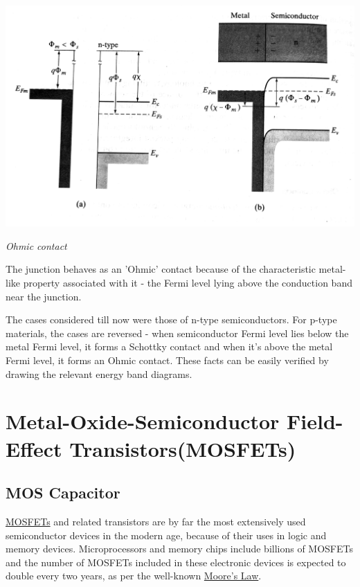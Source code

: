 \documentclass[12 pt]{article}
\begin{document}
\par
\begin{center}
    \includegraphics{Ohmic_Contact.png}
\end{center}
\begin{center}
    \emph{\hspace{2 cm}Ohmic contact\newline}
\end{center}
\par

The junction behaves as an 'Ohmic' contact because of the characteristic metal-like property associated with it - the Fermi level lying above the conduction band near the junction. \par

The cases considered till now were those of n-type semiconductors. For p-type materials, the cases are reversed - when semiconductor Fermi level lies below the metal Fermi level, it forms a Schottky contact and when it's above the metal Fermi level, it forms an Ohmic contact. These facts can be easily verified by drawing the relevant energy band diagrams. \par


\section{Metal-Oxide-Semiconductor Field-Effect Transistors(MOSFETs)}

\subsection{MOS Capacitor}

\href{https://en.wikipedia.org/wiki/MOSFET#:~:text=The%20metal%E2%80%93oxide%E2%80%93semiconductor%20field,the%20conductivity%20of%20the%20device.}{MOSFETs} and related transistors are by far the most extensively used semiconductor devices in the modern age, because of their uses in logic and memory devices. Microprocessors and memory chips include billions of MOSFETs and the number of MOSFETs included in these electronic devices is expected to double every two years, as per the well-known \href{https://en.wikipedia.org/wiki/Moore%27s_law}{Moore's Law}. \newline
\end{document}
